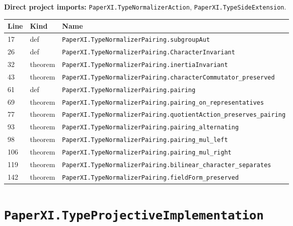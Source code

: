 \documentclass[10pt,oneside]{book}
\begin{document}
\textbf{Direct project imports:} \nolinkurl{PaperXI.TypeNormalizerAction}, \nolinkurl{PaperXI.TypeSideExtension}.

\begin{longtable}{@{}p{}p{}p{}@{}}\toprule Line&Kind&Name\\\midrule\endhead

17&def&\nolinkurl{PaperXI.TypeNormalizerPairing.subgroupAut}\\

26&def&\nolinkurl{PaperXI.TypeNormalizerPairing.CharacterInvariant}\\

32&theorem&\nolinkurl{PaperXI.TypeNormalizerPairing.inertiaInvariant}\\

43&theorem&\nolinkurl{PaperXI.TypeNormalizerPairing.characterCommutator_preserved}\\

61&def&\nolinkurl{PaperXI.TypeNormalizerPairing.pairing}\\

69&theorem&\nolinkurl{PaperXI.TypeNormalizerPairing.pairing_on_representatives}\\

77&theorem&\nolinkurl{PaperXI.TypeNormalizerPairing.quotientAction_preserves_pairing}\\

93&theorem&\nolinkurl{PaperXI.TypeNormalizerPairing.pairing_alternating}\\

98&theorem&\nolinkurl{PaperXI.TypeNormalizerPairing.pairing_mul_left}\\

106&theorem&\nolinkurl{PaperXI.TypeNormalizerPairing.pairing_mul_right}\\

119&theorem&\nolinkurl{PaperXI.TypeNormalizerPairing.bilinear_character_separates}\\

142&theorem&\nolinkurl{PaperXI.TypeNormalizerPairing.fieldForm_preserved}\\

\bottomrule\end{longtable}

\section{\texorpdfstring{\nolinkurl{PaperXI.TypeProjectiveImplementation}}{PaperXI.TypeProjectiveImplementation}}\label{module:PaperXI.TypeProjectiveImplementation}
\end{document}
